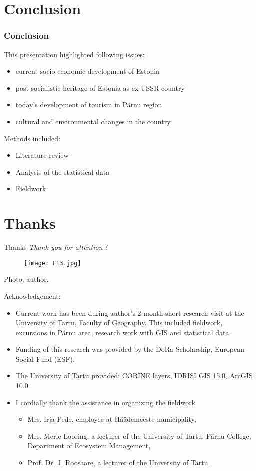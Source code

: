 \documentclass[pdflatex,compress,8pt,
	xcolor={dvipsnames,dvipsnames,svgnames,x11names,table},
	hyperref={	
	breaklinks = true, 
	pdfauthor={Lemenkova Polina}, 
	pdfsubject={Preentation}, 
	pdfcreator={Lemenkova Polina}, 
	pdfproducer={Lemenkova Polina}, 
	colorlinks=true,
	linkcolor=Tomato, 
	citecolor=DeepPink3, 
	urlcolor = NavyBlue, 
	breaklinks = true}]{beamer}
\begin{document}
\section{Conclusion}
\begin{frame}\frametitle{Conclusion}
This presentation highlighted following issues:
\begin{itemize}
	\item current socio-economic development of Estonia
	\item post-socialistic heritage of Estonia as ex-USSR country 
	\item today's development of tourism in Pärnu region
	\item cultural and environmental changes in the country
\end{itemize}
Methods included:
\begin{itemize}
	\item Literature review
	\item Analysis of the statistical data
	\item Fieldwork
\end{itemize}
\end{frame}

\section{Thanks}
\begin{frame}{Thanks}
\vspace{3em}
\emph{Thank you for attention !}\\
\begin{figure}[H]
	\centering
		\texttt{[image: F13.jpg]}
\end{figure}
\small{Photo: author.}\\

\footnotesize{
Acknowledgement: \\
\begin{itemize}
	\item Current work has been during author's 2-month short research visit at the University of Tartu, Faculty of Geography. This included fieldwork, excursions in Pärnu area, research work with GIS and statistical data.
	\item Funding of this research was provided by the DoRa Scholarship, European Social Fund (ESF).
	\item The University of Tartu provided: \alert{CORINE} layers, \alert{IDRISI GIS} 15.0, \alert{ArcGIS} 10.0.
	\item I cordially thank the assistance in organizing the fieldwork 
	\begin{itemize}
		\item Mrs. Irja Pede, employee at Häädemeeste municipality,
		\item Mrs. Merle Looring, a lecturer of the University of Tartu, Pärnu College, \\
		Department of Ecosystem Management, 
		\item Prof. Dr. J. Roosaare, a lecturer of the University of Tartu.
	\end{itemize}
\end{itemize}
}
\end{frame}
\end{document}
